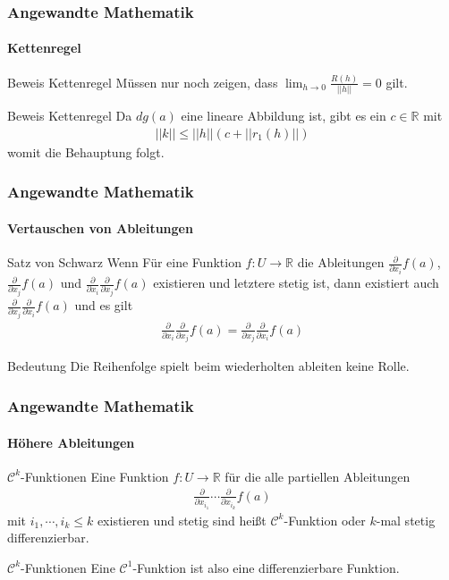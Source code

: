 \documentclass{beamer}
\begin{document}
\begin{frame}
    \frametitle{Angewandte Mathematik}
\framesubtitle{Kettenregel}
    \begin{block}{Beweis Kettenregel}
Müssen nur noch zeigen, dass $\lim_{h \to 0} \frac{R(h)}{||h||} = 0$ gilt.

\end{block}

    \begin{block}{Beweis Kettenregel}
Da $dg(a)$ eine lineare Abbildung ist, gibt es ein $c \in \mathbb{R}$ mit 
\begin{align*}
||k|| \leq ||h|| (c + || r_1(h)||)
\end{align*}
womit die Behauptung folgt.
\end{block}



 \end{frame}





\begin{frame}
    \frametitle{Angewandte Mathematik}
\framesubtitle{Vertauschen von Ableitungen}
    \begin{block}{Satz von Schwarz}
Wenn Für eine Funktion $f: U \to \mathbb{R}$ die Ableitungen $\frac{\partial}{\partial x_i} f(a)$, $\frac{\partial}{\partial x_j}f(a)$ und $ \frac{\partial}{\partial x_i}\frac{\partial }{\partial x_j} f(a)$ existieren und letztere stetig ist, dann existiert auch $ \frac{\partial}{\partial x_j}\frac{\partial }{\partial x_i} f(a)$ und es gilt
\begin{align*}
\frac{\partial}{\partial x_i}\frac{\partial }{\partial x_j} f(a) = \frac{\partial}{\partial x_j}\frac{\partial }{\partial x_i} f(a)
\end{align*}
\end{block}
    \begin{block}{Bedeutung}
Die Reihenfolge spielt beim wiederholten ableiten keine Rolle.
\end{block}
 \end{frame}



\begin{frame}
    \frametitle{Angewandte Mathematik}
\framesubtitle{Höhere Ableitungen}
    \begin{block}{$\mathcal{C}^k$-Funktionen}
Eine  Funktion  $f: U \to \mathbb{R}$ für die alle partiellen Ableitungen 
\begin{align*}
 \frac{\partial}{\partial x_{i_1}} \cdots   \frac{\partial}{\partial x_{i_k}} f(a)
\end{align*}
mit $ i_1,  \cdots, i_k \leq k$ existieren und stetig sind heißt $\mathcal{C}^k$-Funktion oder $k$-mal stetig differenzierbar.
\end{block}
    \begin{block}{$\mathcal{C}^k$-Funktionen}
 Eine  $\mathcal{C}^1$-Funktion ist also eine differenzierbare Funktion.
\end{block}
 \end{frame}
\end{document}
